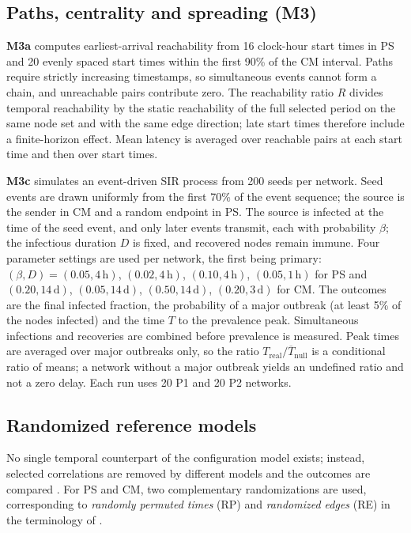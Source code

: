 \subsection{Paths, centrality and spreading (M3)}
\label{sec:m-function}
\textbf{M3a} computes earliest-arrival reachability from 16 clock-hour start times in PS
and 20 evenly spaced start times within the first 90\% of the CM interval. Paths require
strictly increasing timestamps, so simultaneous events cannot form a chain, and unreachable
pairs contribute zero. The reachability ratio $R$ divides temporal reachability by the
static reachability of the full selected period on the same node set and with the same
edge direction; late start times therefore include a finite-horizon effect. Mean latency
is averaged over reachable pairs at each start time and then over start times.



\textbf{M3c} simulates an event-driven SIR process from 200 seeds per network. Seed events
are drawn uniformly from the first 70\% of the event sequence; the source is the sender in
CM and a random endpoint in PS. The source is infected at the time of the seed event, and
only later events transmit, each with probability $\beta$; the infectious duration $D$ is
fixed, and recovered nodes remain immune. Four parameter settings are used per network,
the first being primary: $(\beta,D)=(0.05,4\,\mathrm{h})$, $(0.02,4\,\mathrm{h})$,
$(0.10,4\,\mathrm{h})$, $(0.05,1\,\mathrm{h})$ for PS and $(0.20,14\,\mathrm{d})$,
$(0.05,14\,\mathrm{d})$, $(0.50,14\,\mathrm{d})$, $(0.20,3\,\mathrm{d})$ for CM. The
outcomes are the final infected fraction, the probability of a major outbreak (at least
5\% of the nodes infected) and the time $T$ to the prevalence peak. Simultaneous infections
and recoveries are combined before prevalence is measured. Peak times are averaged over
major outbreaks only, so the ratio $T_{\mathrm{real}}/\overline T_{\mathrm{null}}$ is a
conditional ratio of means; a network without a major outbreak yields an undefined ratio
and not a zero delay. Each run uses 20 P1 and 20 P2 networks.

\subsection{Randomized reference models}
\label{sec:null}
No single temporal counterpart of the configuration model exists; instead, selected
correlations are removed by different models and the outcomes are compared
\citep{holme2012temporal,gauvin2022randomized}. For PS and CM, two complementary
randomizations are used, corresponding to \emph{randomly permuted times} (RP) and
\emph{randomized edges} (RE) in the terminology of \citet{holme2012temporal}.

